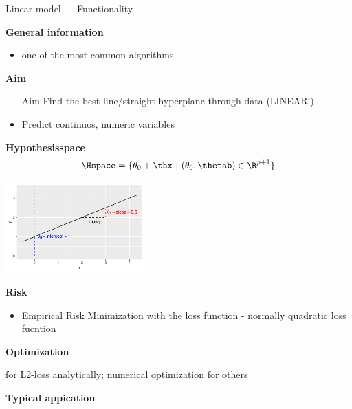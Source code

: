 \documentclass[11pt,compress,t,notes=noshow, xcolor=table]{beamer}
\begin{document}
\begin{vbframe}{Linear model ~~ Functionality}

\textbf{General information}
\begin{itemize}
\item one of the most common algorithms
\end{itemize}

\textbf{Aim}
\begin{itemize}
\item [Aim] Find the best line/straight hyperplane through data (LINEAR!)
\item Predict continuos, numeric variables
\end{itemize}

 
\textbf{Hypothesisspace}
$$\Hspace = \{ \theta_0 + \thx\ |\ (\theta_0, \thetab) \in \R^{p+1} \}$$

\centering \includegraphics[width=0.4\textwidth]{figure/reg_lm_plot} 

\framebreak

\textbf{Risk}
\begin{itemize}
\item Empirical Risk Minimization with the loss function - normally quadratic loss fucntion 
\end{itemize}

\textbf{Optimization}

for L2-loss analytically; numerical optimization for others 


\lz

\textbf{Typical appication}




\end{vbframe}
\end{document}
